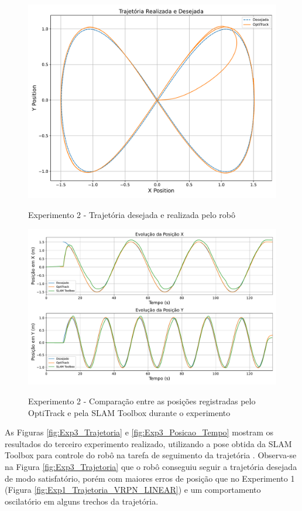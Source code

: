 \begin{figure}[htb]
    \centering
    \caption{Experimento 2 - Trajetória desejada e realizada pelo robô}
    \includegraphics[width=0.8\linewidth]{img/Resultados/Exp2_VRPN_Control_LEMNISCATA/Trajetoria.pdf}
    \source
    \label{fig:Exp2_TrajetoriaVRPN}
\end{figure}

\begin{figure}[htb]
    \centering
    \caption{Experimento 2 - Comparação entre as posições registradas pelo OptiTrack e pela SLAM Toolbox durante o experimento}
    \includegraphics[width=\linewidth]{img/Resultados/Exp2_VRPN_Control_LEMNISCATA/pose_tempo.pdf}
    \source
    \label{fig:Exp2_Comparacao_Posicao_v_tempo}
\end{figure}


As Figuras \ref{fig:Exp3_Trajetoria} e \ref{fig:Exp3_Posicao_Tempo} mostram os resultados do terceiro experimento realizado, utilizando a pose obtida da SLAM Toolbox para controle do robô na tarefa de seguimento da trajetória . Observa-se na Figura \ref{fig:Exp3_Trajetoria} que o robô conseguiu seguir a trajetória desejada de modo satisfatório, porém com maiores erros de posição que no Experimento 1 (Figura \ref{fig:Exp1_Trajetoria_VRPN_LINEAR}) e um comportamento oscilatório em alguns trechos da trajetória.

